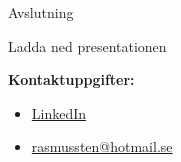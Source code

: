 \documentclass[presentation]{beamer}
\begin{document}
\begin{frame}{Avslutning}

  Ladda ned presentationen

  \textbf{Kontaktuppgifter:}
  \begin{itemize}
    \item \href{https://www.linkedin.com/in/rasmus-sten-788648235/}{LinkedIn}
    \item \href{mailto:rasmussten@hotmail.se}{rasmussten@hotmail.se}
  \end{itemize}

\end{frame}
\end{document}
